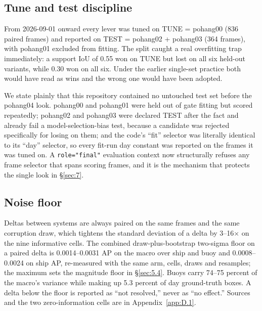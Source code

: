 \documentclass[10pt]{article}
\begin{document}
\subsection{Tune and test discipline}\label{sec:5.2}
From 2026-09-01 onward every lever was tuned on TUNE = pohang00 (836 paired frames) and reported on TEST = pohang02 + pohang03 (364 frames), with pohang01 excluded from fitting. The split caught a real overfitting trap immediately: a support IoU of 0.55 won on TUNE but lost on all six held-out variants, while 0.30 won on all six. Under the earlier single-set practice both would have read as wins and the wrong one would have been adopted.

We state plainly that this repository contained no untouched test set before the pohang04 look. pohang00 and pohang01 were held out of gate fitting but scored repeatedly; pohang02 and pohang03 were declared TEST after the fact and already fail a model-selection-bias test, because a candidate was rejected specifically for losing on them; and the code's ``fit'' selector was literally identical to its ``day'' selector, so every fit-run day constant was reported on the frames it was tuned on. A \texttt{role="final"} evaluation context now structurally refuses any frame selector that spans scoring frames, and it is the mechanism that protects the single look in \S\ref{sec:7}.

\subsection{Noise floor}\label{sec:5.3}
Deltas between systems are always paired on the same frames and the same corruption draw, which tightens the standard deviation of a delta by 3--16$\times$ on the nine informative cells. The combined draw-plus-bootstrap two-sigma floor on a paired delta is 0.0014--0.0031 AP on the macro over ship and buoy and 0.0008--0.0024 on ship AP, re-measured with the same arm, cells, draws and resamples; the maximum sets the magnitude floor in \S\ref{sec:5.4}. Buoys carry 74--75 percent of the macro's variance while making up 5.3 percent of day ground-truth boxes. A delta below the floor is reported as ``not resolved,'' never as ``no effect.'' Sources and the two zero-information cells are in Appendix~\ref{app:D.1}.
\end{document}
